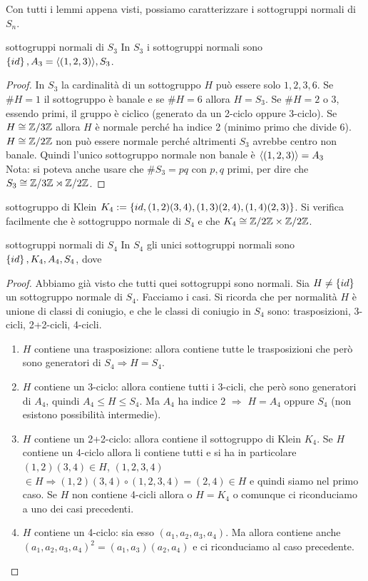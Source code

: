 Con tutti i lemmi appena visti, possiamo caratterizzare i sottogruppi normali di $S_n$.
\begin{example2}{sottogruppi normali di $S_3$}
    In $S_3$ i sottogruppi normali sono $\left\{ id \right\}, A_3 = \langle (1,2,3) \rangle, S_3$.
\end{example2}
\begin{proof}
    In $S_3$ la cardinalità di un sottogruppo $H$ può essere solo $1,2,3,6$. Se $\#H = 1$ il sottogruppo è banale e se $\#H = 6$ allora $H = S_3$. Se $\#H = 2$ o $3$, essendo primi, il gruppo è ciclico (generato da un 2-ciclo oppure 3-ciclo). Se $H \cong \mathbb{Z}/3\mathbb{Z}$ allora $H$ è normale perché ha indice 2 (minimo primo che divide 6). $H \cong \mathbb{Z}/2\mathbb{Z}$ non può essere normale perché altrimenti $S_3$ avrebbe centro non banale. Quindi l'unico sottogruppo normale non banale è $\langle (1,2,3) \rangle = A_3$\\
    Nota: si poteva anche usare che $\#S_3 = pq$ con $p,q$ primi, per dire che $S_3 \cong \mathbb{Z}/3\mathbb{Z} \rtimes \mathbb{Z}/2\mathbb{Z}$.
\end{proof}
\begin{definition}{sottogruppo di Klein}
    $K_4 := \left\{ id, (1,2)(3,4), (1,3)(2,4), (1,4)(2,3) \right\}$. Si verifica facilmente che è sottogruppo normale di $S_4$ e che $K_4 \cong \mathbb{Z}/2\mathbb{Z} \times \mathbb{Z}/2\mathbb{Z}$.
\end{definition}
\begin{example2}{sottogruppi normali di $S_4$}
    In $S_4$ gli unici sottogruppi normali sono $\left\{ id \right\}, K_4, A_4, S_4$, dove 
\end{example2}
\begin{proof}
    Abbiamo già visto che tutti quei sottogruppi sono normali. Sia $H \neq \left\{ id \right\}$ un sottogruppo normale di $S_4$. Facciamo i casi. Si ricorda che per normalità $H$ è unione di classi di coniugio, e che le classi di coniugio in $S_4$ sono: trasposizioni, 3-cicli, 2+2-cicli, 4-cicli.
    \begin{enumerate}
        \item $H$ contiene una trasposizione: allora contiene tutte le trasposizioni che però sono generatori di $S_4 \Rightarrow H = S_4$. 
        \item $H$ contiene un 3-ciclo: allora contiene tutti i 3-cicli, che però sono generatori di $A_4$, quindi $A_4 \leq H \leq S_4$. Ma $A_4$ ha indice 2 $\Rightarrow$ $H = A_4$ oppure $S_4$ (non esistono possibilità intermedie).
        \item $H$ contiene un 2+2-ciclo: allora contiene il sottogruppo di Klein $K_4$. Se $H$ contiene un 4-ciclo allora li contiene tutti e si ha in particolare $(1,2)(3,4) \in H$, $(1,2,3,4)$ $\in H \Rightarrow (1,2)(3,4)\circ(1,2,3,4) = (2,4) \in H$ e quindi siamo nel primo caso. Se $H$ non contiene 4-cicli allora o $H = K_4$ o comunque ci riconduciamo a uno dei casi precedenti.
        \item $H$ contiene un 4-ciclo: sia esso $(a_1,a_2,a_3,a_4)$. Ma allora contiene anche $(a_1,a_2,a_3,a_4)^2 = (a_1,a_3)(a_2,a_4)$ e ci riconduciamo al caso precedente.
    \end{enumerate}
\end{proof}


